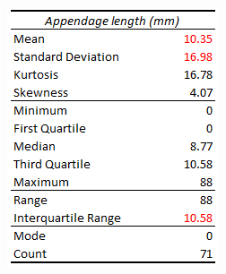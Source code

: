 \documentclass[20pt,landscape,footrule,headrule]{foils}
\begin{document}
\begin{center}\includegraphics[height=0.72\textheight]{Images/appendage_length_descriptive_EN}
\end{center}  
\end{document}
